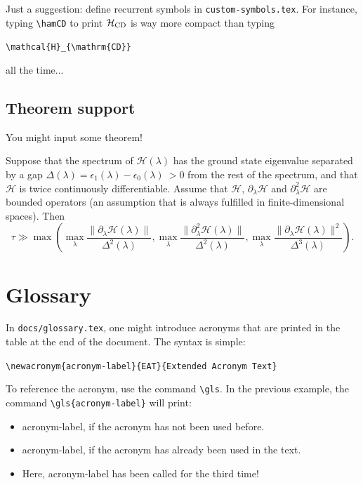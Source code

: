Just a suggestion: define recurrent symbols in \texttt{custom-symbols.tex}. For instance, typing \verb|\hamCD| to print $\mathcal{H}_{\mathrm{CD}}$ is way more compact than typing
\begin{center}
    \verb|\mathcal{H}_{\mathrm{CD}}|
\end{center}
all the time...





\subsection{Theorem support}\label{sec:theorems}

You might input some theorem!

\begin{theorem}
Suppose that the spectrum of $\mathcal{H}(\lambda)$ has the ground state eigenvalue separated by a gap $\Delta(\lambda)=\epsilon_1(\lambda)-\epsilon_0(\lambda)\ >0$ from the rest of the spectrum, and that $\mathcal{H}$ is twice continuously differentiable. Assume that $\mathcal{H}$, $\partial_\lambda\mathcal{H}$ and $\partial^2_\lambda\mathcal{H}$ are bounded operators (an assumption that is always fulfilled in finite-dimensional spaces). Then
\begin{equation}
    \tau \gg \max\left(
        \max_\lambda \frac{\|\partial_\lambda\mathcal{H}(\lambda)\|}{\Delta^2(\lambda)},
        \max_\lambda \frac{\|\partial^2_\lambda\mathcal{H}(\lambda)\|}{\Delta^2(\lambda)}, 
        \max_\lambda \frac{\|\partial_\lambda\mathcal{H}(\lambda)\|^2}{\Delta^3(\lambda)}
    \right) .
\end{equation}
\end{theorem}








\section{Glossary}

In \texttt{docs/glossary.tex}, one might introduce acronyms that are printed in the table at the end of the document. The syntax is simple:

\begin{center}
    \verb|\newacronym{acronym-label}{EAT}{Extended Acronym Text}|
\end{center}

To reference the acronym, use the command \verb|\gls|. 
In the previous example, the command \verb|\gls{acronym-label}| will print:
\begin{itemize}
    \item \gls{acronym-label}, if the acronym has not been used before.
    \item \gls{acronym-label}, if the acronym has already been used in the text.
    \item Here, \gls{acronym-label} has been called for the third time!
\end{itemize}

